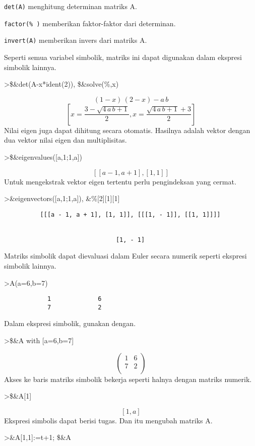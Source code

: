 \documentclass[
]{book}
\begin{document}
\texttt{det(A)} menghitung determinan matriks A.

\texttt{factor(\%\ )} memberikan faktor-faktor dari determinan.

\texttt{invert(A)} memberikan invers dari matriks A.

Seperti semua variabel simbolik, matriks ini dapat digunakan dalam ekspresi simbolik lainnya.

\textgreater\$\&det(A-x*ident(2)), \$\&solve(\%,x)

\[\left(1-x\right)\,\left(2-x\right)-a\,b\]\[\left[ x=\frac{3-\sqrt{4\,a\,b+1}}{2} , x=\frac{\sqrt{4\,a\,b+1}+3
 }{2} \right] \]Nilai eigen juga dapat dihitung secara otomatis. Hasilnya adalah vektor dengan dua vektor nilai eigen dan multiplisitas.

\textgreater\$\&eigenvalues({[}a,1;1,a{]})

\[\left[ \left[ a-1 , a+1 \right]  , \left[ 1 , 1 \right]  \right] \]Untuk mengekstrak vektor eigen tertentu perlu pengindeksan yang cermat.

\textgreater\&eigenvectors({[}a,1;1,a{]}), \&\%{[}2{]}{[}1{]}{[}1{]}

\begin{verbatim}
          [[[a - 1, a + 1], [1, 1]], [[[1, - 1]], [[1, 1]]]]


                               [1, - 1]
\end{verbatim}

Matriks simbolik dapat dievaluasi dalam Euler secara numerik seperti ekspresi simbolik lainnya.

\textgreater A(a=6,b=7)

\begin{verbatim}
            1             6 
            7             2 
\end{verbatim}

Dalam ekspresi simbolik, gunakan dengan.

\textgreater\$\&A with {[}a=6,b=7{]}

\[\begin{pmatrix}1 & 6 \\ 7 & 2 \\ \end{pmatrix}\]Akses ke baris matriks simbolik bekerja seperti halnya dengan matriks numerik.

\textgreater\$\&A{[}1{]}

\[\left[ 1 , a \right] \]Ekspresi simbolis dapat berisi tugas. Dan itu mengubah matriks A.

\textgreater\&A{[}1,1{]}:=t+1; \$\&A
\end{document}
